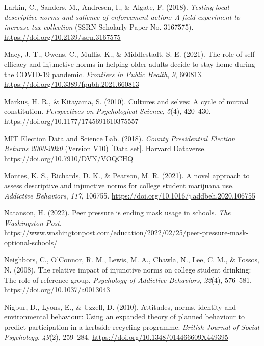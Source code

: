 \documentclass[
  english,
  man,floatsintext]{apa6}
\newlength{\cslhangindent}
\newlength{\cslentryspacingunit} %
\newenvironment{CSLReferences}[2] %
 {%
  \setlength{\parindent}{0pt}
  \ifodd #1
  \let\oldpar\par
  \def\par{\hangindent=\cslhangindent\oldpar}
  \fi
  \setlength{\parskip}{#2\cslentryspacingunit}
 }%
 {}
\begin{document}
\begin{CSLReferences}{1}{0}
\leavevmode{}%
Larkin, C., Sanders, M., Andresen, I., \& Algate, F. (2018). \emph{Testing local descriptive norms and salience of enforcement action: A field experiment to increase tax collection} (SSRN Scholarly Paper No. 3167575). \url{https://doi.org/10.2139/ssrn.3167575}

\leavevmode{}%
Macy, J. T., Owens, C., Mullis, K., \& Middlestadt, S. E. (2021). The role of self-efficacy and injunctive norms in helping older adults decide to stay home during the {COVID-19} pandemic. \emph{Frontiers in Public Health}, \emph{9}, 660813. \url{https://doi.org/10.3389/fpubh.2021.660813}

\leavevmode{}%
Markus, H. R., \& Kitayama, S. (2010). Cultures and selves: A cycle of mutual constitution. \emph{Perspectives on Psychological Science}, \emph{5}(4), 420--430. \url{https://doi.org/10.1177/1745691610375557}

\leavevmode{}%
MIT Election Data and Science Lab. (2018). \emph{{County Presidential Election Returns 2000-2020}} (Version V10) {[}Data set{]}. {Harvard Dataverse}. \url{https://doi.org/10.7910/DVN/VOQCHQ}

\leavevmode{}%
Montes, K. S., Richards, D. K., \& Pearson, M. R. (2021). A novel approach to assess descriptive and injunctive norms for college student marijuana use. \emph{Addictive Behaviors}, \emph{117}, 106755. \url{https://doi.org/10.1016/j.addbeh.2020.106755}

\leavevmode{}%
Natanson, H. (2022). Peer pressure is ending mask usage in schools. \emph{The Washingston Post}. \url{https://www.washingtonpost.com/education/2022/02/25/peer-pressure-mask-optional-schools/}

\leavevmode{}%
Neighbors, C., O'Connor, R. M., Lewis, M. A., Chawla, N., Lee, C. M., \& Fossos, N. (2008). The relative impact of injunctive norms on college student drinking: The role of reference group. \emph{Psychology of Addictive Behaviors}, \emph{22}(4), 576--581. \url{https://doi.org/10.1037/a0013043}

\leavevmode{}%
Nigbur, D., Lyons, E., \& Uzzell, D. (2010). Attitudes, norms, identity and environmental behaviour: Using an expanded theory of planned behaviour to predict participation in a kerbside recycling programme. \emph{British Journal of Social Psychology}, \emph{49}(2), 259--284. \url{https://doi.org/10.1348/014466609X449395}


\end{CSLReferences}
\end{document}
